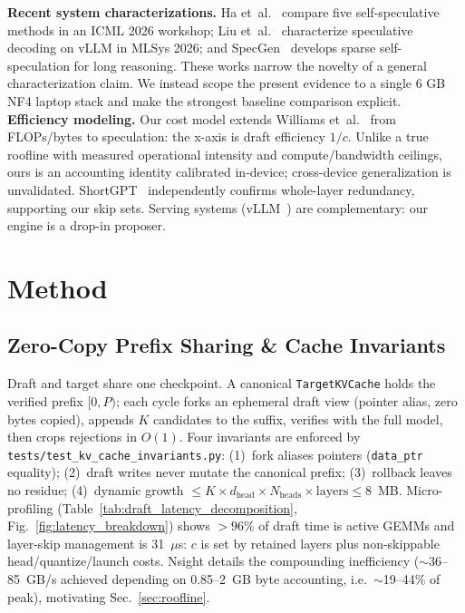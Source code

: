 \documentclass[10pt,twocolumn,letterpaper]{article}
\begin{document}
\textbf{Recent system characterizations.} Ha et~al.~\cite{ha2026characterizing} compare five self-speculative methods in an ICML 2026 workshop; Liu et~al.~\cite{liu2026illusion} characterize speculative decoding on vLLM in MLSys 2026; and SpecGen~\cite{zhao2026specgen} develops sparse self-speculation for long reasoning. These works narrow the novelty of a general characterization claim. We instead scope the present evidence to a single 6 GB NF4 laptop stack and make the strongest baseline comparison explicit.
\textbf{Efficiency modeling.} Our cost model extends Williams et~al.~\cite{williams2009roofline} from FLOPs/bytes to speculation: the x-axis is draft efficiency $1/c$. Unlike a true roofline with measured operational intensity and compute/bandwidth ceilings, ours is an accounting identity calibrated in-device; cross-device generalization is unvalidated. ShortGPT~\cite{men2024shortgpt} independently confirms whole-layer redundancy, supporting our skip sets. Serving systems (vLLM~\cite{kwon2023pagedattention}) are complementary: our engine is a drop-in proposer.

\section{Method}
\label{sec:method}

\subsection{Zero-Copy Prefix Sharing \& Cache Invariants}
\label{sec:system}

Draft and target share one checkpoint. A canonical \texttt{TargetKVCache} holds the verified prefix $[0,P)$; each cycle forks an ephemeral draft view (pointer alias, zero bytes copied), appends $K$ candidates to the suffix, verifies with the full model, then crops rejections in $O(1)$. Four invariants are enforced by \texttt{tests/test\_kv\_cache\_invariants.py}: (1)~fork aliases pointers (\texttt{data\_ptr} equality); (2)~draft writes never mutate the canonical prefix; (3)~rollback leaves no residue; (4)~dynamic growth $\le K{\times}d_{\text{head}}{\times}N_{\text{heads}}{\times}\text{layers} \le 8$~MB. Micro-profiling (Table~\ref{tab:draft_latency_decomposition}, Fig.~\ref{fig:latency_breakdown}) shows $>96\%$ of draft time is active GEMMs and layer-skip management is 31~$\mu$s: $c$ is set by retained layers plus non-skippable head/quantize/launch costs. Nsight details the compounding inefficiency ($\sim$36--85~GB/s achieved depending on 0.85--2~GB byte accounting, i.e.\ $\sim$19--44\% of peak), motivating Sec.~\ref{sec:roofline}.
\end{document}
